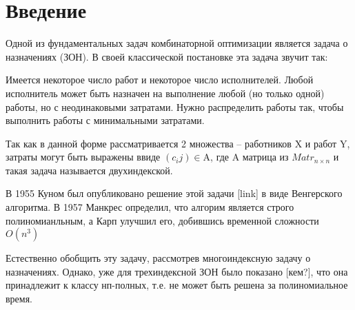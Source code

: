 \chapter{Введение}

Одной из фундаментальных задач комбинаторной оптимизации является задача о назначениях (ЗОН). 
В своей классической постановке эта задача звучит так: 

Имеется некоторое число работ и некоторое число исполнителей. Любой исполнитель может быть назначен на выполнение любой (но только одной) работы, но с неодинаковыми затратами. Нужно распределить работы так, чтобы выполнить работы с минимальными затратами.

Так как в данной форме рассматривается 2 множества -- работников $\mathrm{X}$ и работ $\mathrm{Y}$, затраты могут быть выражены ввиде $(c_ij) \in \mathrm{A}$, где $\mathrm{A}$ матрица из $Matr_{n \times n}$ и такая задача называется двухиндекской. 

В 1955 Куном был опубликовано решение этой задачи [link] в виде Венгерского алгоритма. В 1957 Манкрес определил, что 
алгорим является строго полиномианльным, а Карп улучшил его, добившись временной сложности $O(n^3)$

Естественно обобщить эту задачу, рассмотрев многоиндексную задачу о назначениях. Однако, уже 
для трехиндексной ЗОН было показано [кем?], что она принадлежит к классу нп-полных, т.е. не может быть решена за полиномиальное время. 